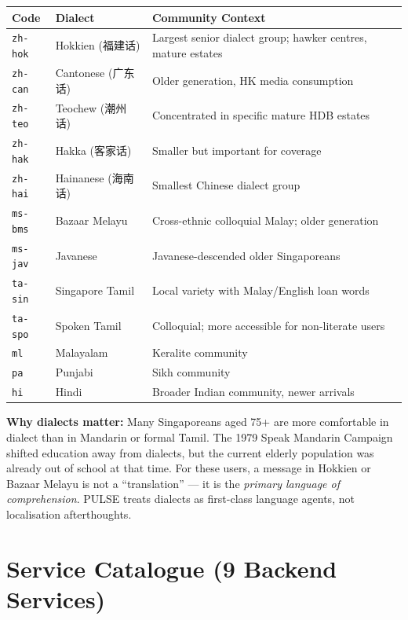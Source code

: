 \documentclass[12pt,a4paper]{article}
\begin{document}
\begin{tabular}{@{}lll@{}}
\toprule
\textbf{Code} & \textbf{Dialect} & \textbf{Community Context} \\
\midrule
\texttt{zh-hok} & Hokkien (福建话) & Largest senior dialect group; hawker centres, mature estates \\
\texttt{zh-can} & Cantonese (广东话) & Older generation, HK media consumption \\
\texttt{zh-teo} & Teochew (潮州话) & Concentrated in specific mature HDB estates \\
\texttt{zh-hak} & Hakka (客家话) & Smaller but important for coverage \\
\texttt{zh-hai} & Hainanese (海南话) & Smallest Chinese dialect group \\
\texttt{ms-bms} & Bazaar Melayu & Cross-ethnic colloquial Malay; older generation \\
\texttt{ms-jav} & Javanese & Javanese-descended older Singaporeans \\
\texttt{ta-sin} & Singapore Tamil & Local variety with Malay/English loan words \\
\texttt{ta-spo} & Spoken Tamil & Colloquial; more accessible for non-literate users \\
\texttt{ml}     & Malayalam & Keralite community \\
\texttt{pa}     & Punjabi & Sikh community \\
\texttt{hi}     & Hindi & Broader Indian community, newer arrivals \\
\bottomrule
\end{tabular}

\begin{callout}
\textbf{Why dialects matter:} Many Singaporeans aged 75+ are more comfortable in dialect
than in Mandarin or formal Tamil. The 1979 Speak Mandarin Campaign shifted education away
from dialects, but the current elderly population was already out of school at that time.
For these users, a message in Hokkien or Bazaar Melayu is not a ``translation'' — it is
the \textit{primary language of comprehension}. PULSE treats dialects as first-class
language agents, not localisation afterthoughts.
\end{callout}

\section{Service Catalogue (9 Backend Services)}
\label{sec:services}
\end{document}
